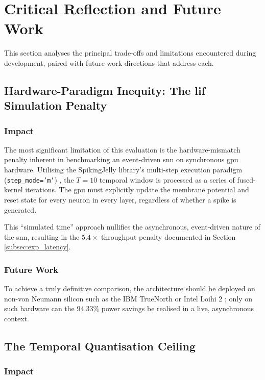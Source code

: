 \section{Critical Reflection and Future Work}
\label{sec:critical_reflection_future_work}

This section analyses the principal trade-offs and limitations encountered during development, paired with future-work directions that address each.

\subsection{Hardware-Paradigm Inequity: The \gls{lif} Simulation Penalty}

\subsubsection*{Impact}

The most significant limitation of this evaluation is the hardware-mismatch penalty inherent in benchmarking an event-driven \gls{snn} on synchronous \gls{gpu} hardware. 
Utilising the SpikingJelly library's multi-step execution paradigm (\texttt{step\_mode='m'}) \cite{fang2023spikingjelly}, the $T=10$ temporal window is processed as a series of fused-kernel iterations. The \gls{gpu} must explicitly update the membrane potential and reset state for every neuron in every layer, regardless of whether a spike is generated. 

This ``simulated time'' approach nullifies the asynchronous, event-driven nature of the \gls{snn}, resulting in the $5.4\times$ throughput penalty documented in Section \ref{subsec:exp_latency}. 

\subsubsection*{Future Work}
To achieve a truly definitive comparison, the architecture should be deployed on non-von Neumann silicon such as the IBM TrueNorth \cite{merolla2014million} or Intel Loihi 2 \cite{gralewicz2024spikes};
only on such hardware can the $94.33\%$ power savings be realised in a live, asynchronous context.

\subsection{The Temporal Quantisation Ceiling}

\subsubsection*{Impact}

